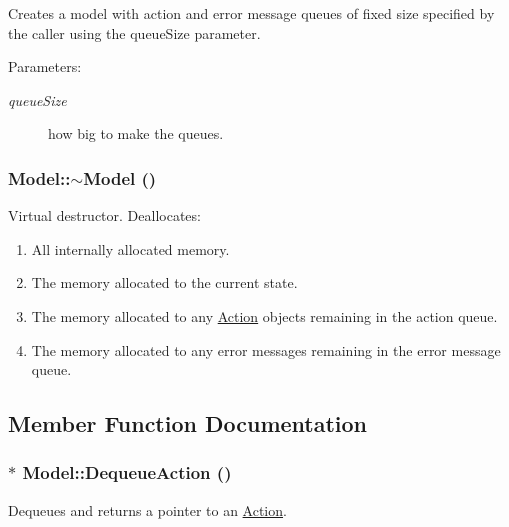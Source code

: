 Creates a model with action and error message queues of fixed size specified by the caller using the queueSize parameter. \begin{Desc}
\item[Parameters:]
\begin{description}
\item[{\em queueSize}]how big to make the queues. \end{description}
\end{Desc}
\hypertarget{classModel_d6ebd2062a0b823db841a0b88baac4c0}{
\subsubsection[{$\sim$Model}]{\setlength{\rightskip}{0pt plus 5cm}Model::$\sim$Model ()}}
\label{classModel_d6ebd2062a0b823db841a0b88baac4c0}


Virtual destructor. Deallocates: \begin{enumerate}
\item All internally allocated memory. \item The memory allocated to the current state. \item The memory allocated to any \hyperlink{classAction}{Action} objects remaining in the action queue. \item The memory allocated to any error messages remaining in the error message queue. \end{enumerate}


\subsection{Member Function Documentation}
\hypertarget{classModel_49c672e91b844a13b8cbee1d2382a5b4}{
\subsubsection[{DequeueAction}]{ $\ast$ Model::DequeueAction ()}}
\label{classModel_49c672e91b844a13b8cbee1d2382a5b4}


Dequeues and returns a pointer to an \hyperlink{classAction}{Action}. 

